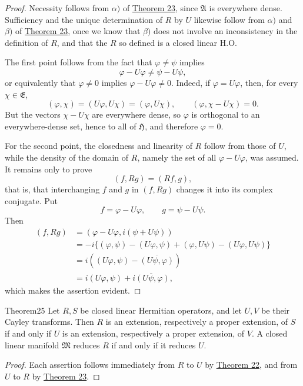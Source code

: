 ﻿\documentclass[paper=b5,fontsize=13pt,bookmarkpackage=false,twoside]{scrartcl}
\begin{document}
\begin{proof}
Necessity follows from $\alpha)$ of \hyperref[thm:23]{Theorem 23}, since $\mathfrak A$ is everywhere dense. Sufficiency and the unique determination of $R$ by $U$ likewise follow from $\alpha)$ and $\beta)$ of \hyperref[thm:23]{Theorem 23}, once we know that $\beta)$ does not involve an inconsistency in the definition of $R$, and that the $R$ so defined is a closed linear H.O.

The first point follows from the fact that $\varphi\ne\psi$ implies
\[
\varphi-U\varphi\ne\psi-U\psi,
\]
or equivalently that $\varphi\ne0$ implies $\varphi-U\varphi\ne0$. Indeed, if $\varphi=U\varphi$, then, for every $\chi\in\mathfrak E$,
\[
(\varphi,\chi)=(U\varphi,U\chi)=(\varphi,U\chi),
\qquad
(\varphi,\chi-U\chi)=0.
\]
But the vectors $\chi-U\chi$ are everywhere dense, so $\varphi$ is orthogonal to an everywhere-dense set, hence to all of $\mathfrak H$, and therefore $\varphi=0$.

For the second point, the closedness and linearity of $R$ follow from those of $U$, while the density of the domain of $R$, namely the set of all $\varphi-U\varphi$, was assumed. It remains only to prove
\[
(f,Rg)=(Rf,g),
\]
that is, that interchanging $f$ and $g$ in $(f,Rg)$ changes it into its complex conjugate. Put
\[
f=\varphi-U\varphi,\qquad g=\psi-U\psi.
\]
Then
\begin{align*}
(f,Rg)
 &=(\varphi-U\varphi,i(\psi+U\psi))\\
 &=-i\{(\varphi,\psi)-(U\varphi,\psi)
      +(\varphi,U\psi)-(U\varphi,U\psi)\}\\
 &=i\left((U\varphi,\psi)-\overline{(U\psi,\varphi)}\right)\\
 &=i(U\varphi,\psi)+\overline{i(U\psi,\varphi)},
\end{align*}
which makes the assertion evident.
\end{proof}

\begin{namedstatement}{Theorem}{25}\label{thm:25}
Let $R,S$ be closed linear Hermitian operators, and let $U,V$ be their Cayley transforms. Then $R$ is an extension, respectively a proper extension, of $S$ if and only if $U$ is an extension, respectively a proper extension, of $V$. A closed linear manifold $\mathfrak M$ reduces $R$ if and only if it reduces $U$.
\end{namedstatement}

\begin{proof}
Each assertion follows immediately from $R$ to $U$ by \hyperref[thm:22]{Theorem 22}, and from $U$ to $R$ by \hyperref[thm:23]{Theorem 23}.
\end{proof}
\end{document}
